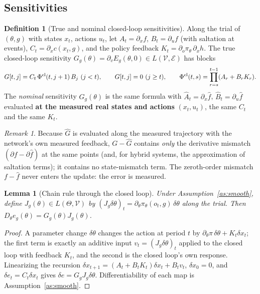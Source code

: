 \documentclass[11pt]{article}
\newtheorem{lemma}[theorem]{Lemma}
\theoremstyle{definition}
\newtheorem{definition}[theorem]{Definition}
\theoremstyle{remark}
\newtheorem{remark}[theorem]{Remark}
\newcommand{\cV}{\mathcal{V}}
\newcommand{\cE}{\mathcal{E}}
\newcommand{\Ghat}{\widehat G}
\newcommand{\fhat}{\widehat f}
\begin{document}
\subsection{Sensitivities}
\begin{definition}[True and nominal closed-loop sensitivities]\label{def:G}
Along the trial of $(\theta,g)$ with states $x_t$, actions $u_t$, let $A_t=\partial_x f$, $B_t=\partial_u f$ (with
saltation at events), $C_t=\partial_x c(x_t,g)$, and the policy feedback $K_t=\partial_o\pi_\theta\,\partial_x h$.
The true closed-loop sensitivity $G_g(\theta)=\partial_v E_g(\theta,0)\in L(\cV,\cE)$ has blocks
\[G[t,j]=C_t\,\Phi^{\rm cl}(t,j+1)\,B_j\ (j<t),\qquad G[t,j]=0\ (j\ge t),\qquad
\Phi^{\rm cl}(t,s)=\prod_{r=s}^{t-1}(A_r+B_rK_r).\]
The \emph{nominal} sensitivity $\Ghat_g(\theta)$ is the same formula with $\widehat A_t=\partial_x\fhat$,
$\widehat B_t=\partial_u\fhat$ evaluated \textbf{at the measured real states and actions} $(x_t,u_t)$, the same $C_t$ and
the same $K_t$.
\end{definition}
\begin{remark}
Because $\Ghat$ is evaluated along the measured trajectory with the network's own measured feedback, $G-\Ghat$ contains
\emph{only} the derivative mismatch $(\partial f-\partial\fhat)$ at the same points (and, for hybrid systems, the
approximation of saltation terms); it contains no state-mismatch term. The zeroth-order mismatch $f-\fhat$ never enters
the update: the error is measured.
\end{remark}

\begin{lemma}[Chain rule through the closed loop]\label{lem:chain}
Under Assumption~\ref{as:smooth}, define $J_g(\theta)\in L(\Theta,\cV)$ by $(J_g\delta\theta)_t=\partial_\theta
\pi_\theta(o_t,g)\,\delta\theta$ along the trial. Then $D_\theta e_g(\theta)=G_g(\theta)J_g(\theta)$.
\end{lemma}
\begin{proof}
A parameter change $\delta\theta$ changes the action at period $t$ by $\partial_\theta\pi\,\delta\theta+K_t\delta x_t$;
the first term is exactly an additive input $v_t=(J_g\delta\theta)_t$ applied to the closed loop with feedback $K_t$,
and the second is the closed loop's own response. Linearizing the recursion $\delta x_{t+1}=(A_t+B_tK_t)\delta
x_t+B_t v_t$, $\delta x_0=0$, and $\delta e_t=C_t\delta x_t$ gives $\delta e=G_gJ_g\delta\theta$.
Differentiability of each map is Assumption~\ref{as:smooth}.
\end{proof}
\end{document}
